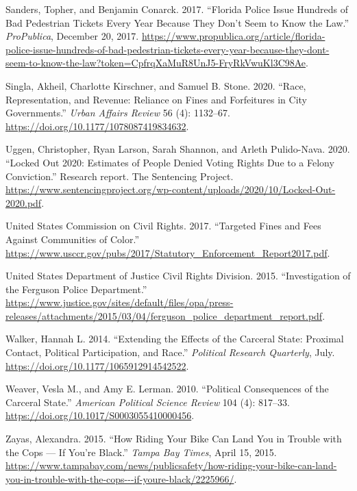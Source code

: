 \documentclass[
  12pt,
]{article}
\newlength{\cslhangindent}
\newenvironment{cslreferences}%
  {\setlength{\parindent}{0pt}%
  \everypar{\setlength{\hangindent}{\cslhangindent}}\ignorespaces}%
  {\par}
\begin{document}
\begin{cslreferences}
\leavevmode\hypertarget{ref-Sanders2017}{}%
Sanders, Topher, and Benjamin Conarck. 2017. ``Florida Police Issue Hundreds of Bad Pedestrian Tickets Every Year Because They Don't Seem to Know the Law.'' \emph{ProPublica}, December 20, 2017. \url{https://www.propublica.org/article/florida-police-issue-hundreds-of-bad-pedestrian-tickets-every-year-because-they-dont-seem-to-know-the-law?token=CpfrqXaMuR8UnJ5-FryRkVwuKl3C98Ae}.

\leavevmode\hypertarget{ref-Singla2020}{}%
Singla, Akheil, Charlotte Kirschner, and Samuel B. Stone. 2020. ``Race, Representation, and Revenue: Reliance on Fines and Forfeitures in City Governments.'' \emph{Urban Affairs Review} 56 (4): 1132--67. \url{https://doi.org/10.1177/1078087419834632}.

\leavevmode\hypertarget{ref-Uggen2020}{}%
Uggen, Christopher, Ryan Larson, Sarah Shannon, and Arleth Pulido-Nava. 2020. ``Locked Out 2020: Estimates of People Denied Voting Rights Due to a Felony Conviction.'' Research report. The Sentencing Project. \url{https://www.sentencingproject.org/wp-content/uploads/2020/10/Locked-Out-2020.pdf}.

\leavevmode\hypertarget{ref-UnitedStatesCommissiononCivilRights2017}{}%
United States Commission on Civil Rights. 2017. ``Targeted Fines and Fees Against Communities of Color.'' \url{https://www.usccr.gov/pubs/2017/Statutory_Enforcement_Report2017.pdf}.

\leavevmode\hypertarget{ref-UnitedStatesDepartmentofJusticeCivilRightsDivision2015}{}%
United States Department of Justice Civil Rights Division. 2015. ``Investigation of the Ferguson Police Department.'' \url{https://www.justice.gov/sites/default/files/opa/press-releases/attachments/2015/03/04/ferguson_police_department_report.pdf}.

\leavevmode\hypertarget{ref-Walker2014}{}%
Walker, Hannah L. 2014. ``Extending the Effects of the Carceral State: Proximal Contact, Political Participation, and Race.'' \emph{Political Research Quarterly}, July. \url{https://doi.org/10.1177/1065912914542522}.

\leavevmode\hypertarget{ref-Weaver2010}{}%
Weaver, Vesla M., and Amy E. Lerman. 2010. ``Political Consequences of the Carceral State.'' \emph{American Political Science Review} 104 (4): 817--33. \url{https://doi.org/10.1017/S0003055410000456}.

\leavevmode\hypertarget{ref-Zayas2015}{}%
Zayas, Alexandra. 2015. ``How Riding Your Bike Can Land You in Trouble with the Cops --- If You're Black.'' \emph{Tampa Bay Times}, April 15, 2015. \url{https://www.tampabay.com/news/publicsafety/how-riding-your-bike-can-land-you-in-trouble-with-the-cops---if-youre-black/2225966/}.
\end{cslreferences}
\end{document}

